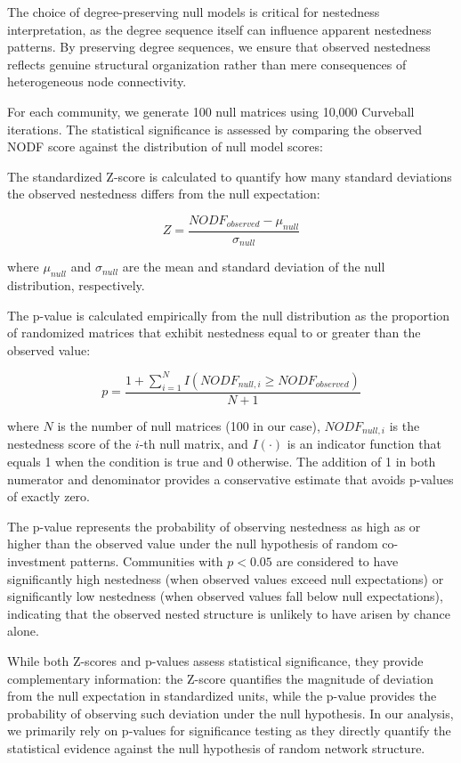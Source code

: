 The choice of degree-preserving null models is critical for nestedness interpretation, as the degree sequence itself can influence apparent nestedness patterns. By preserving degree sequences, we ensure that observed nestedness reflects genuine structural organization rather than mere consequences of heterogeneous node connectivity.

For each community, we generate 100 null matrices using 10,000 Curveball iterations. The statistical significance is assessed by comparing the observed NODF score against the distribution of null model scores:


The standardized Z-score is calculated to quantify how many standard deviations the observed nestedness differs from the null expectation:

\begin{equation}
Z = \frac{NODF_{observed} - \mu_{null}}{\sigma_{null}}
\end{equation}

where $\mu_{null}$ and $\sigma_{null}$ are the mean and standard deviation of the null distribution, respectively.

The p-value is calculated empirically from the null distribution as the proportion of randomized matrices that exhibit nestedness equal to or greater than the observed value:

\begin{equation}
p = \frac{1 + \sum_{i=1}^{N} I(NODF_{null,i} \geq NODF_{observed})}{N + 1}
\end{equation}

where $N$ is the number of null matrices (100 in our case), $NODF_{null,i}$ is the nestedness score of the $i$-th null matrix, and $I(\cdot)$ is an indicator function that equals 1 when the condition is true and 0 otherwise. The addition of 1 in both numerator and denominator provides a conservative estimate that avoids p-values of exactly zero.

The p-value represents the probability of observing nestedness as high as or higher than the observed value under the null hypothesis of random co-investment patterns. Communities with $p < 0.05$ are considered to have significantly high nestedness (when observed values exceed null expectations) or significantly low nestedness (when observed values fall below null expectations), indicating that the observed nested structure is unlikely to have arisen by chance alone.

While both Z-scores and p-values assess statistical significance, they provide complementary information: the Z-score quantifies the magnitude of deviation from the null expectation in standardized units, while the p-value provides the probability of observing such deviation under the null hypothesis. In our analysis, we primarily rely on p-values for significance testing as they directly quantify the statistical evidence against the null hypothesis of random network structure.

